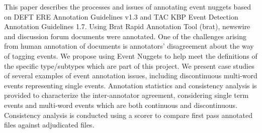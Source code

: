 This paper describes the processes and issues of annotating event nuggets based on DEFT ERE Annotation Guidelines v1.3 and TAC KBP Event Detection Annotation Guidelines 1.7. Using Brat Rapid Annotation Tool (brat), newswire and discussion forum documents were annotated. One of the challenges arising from human annotation of documents is annotators' disagreement about the way of tagging events. We propose using Event Nuggets to help meet the definitions of the specific type/subtypes which are part of this project. We present case studies of several examples of event annotation issues, including discontinuous multi-word events representing single events. Annotation statistics and consistency analysis is provided to characterize the inter-annotator agreement, considering single term events and multi-word events which are both continuous and discontinuous. Consistency analysis is conducted using a scorer to compare first pass annotated files against adjudicated files.
